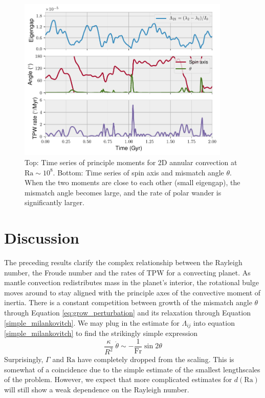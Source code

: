 \documentclass[extra,mreferee]{gji}
\begin{document}
\begin{figure}
\centering
\label{misfit}
\includegraphics[width=0.9\textwidth]{figures/misfit.pdf}
\caption{Top: Time series of principle moments for 2D annular convection at $\mathrm{Ra}\sim10^8$.  Bottom: Time series of spin axis and mismatch angle $\theta$.  When the two moments are close to each other (small eigengap), the mismatch angle becomes large, and the rate of polar wander is significantly larger.}
\end{figure}



\section{Discussion}

The preceding results clarify the complex relationship between the Rayleigh number, the Froude number and the rates of TPW for a convecting planet.
As mantle convection redistributes mass in the planet's interior, the rotational bulge moves around to stay aligned with the principle axes of the convective moment of inertia. 
There is a constant competition between growth of the mismatch angle $\theta$ through Equation \ref{eq:grow_perturbation} and its relaxation through Equation \ref{simple_milankovitch}.
We may plug in the estimate for $\Lambda_{ij}$ into equation \ref{simple_milankovitch} to find the strikingly simple expression
\begin{equation}
\frac{\kappa}{R^2} \; \dot{\theta} \sim -\frac{1}{\mathrm{Fr}} \sin{2 \theta}
\label{eq:simplest_milankovitch}
\end{equation}
Surprisingly, $\Gamma$ and $\mathrm{Ra}$ have completely dropped from the scaling. 
This is somewhat of a coincidence due to the simple estimate of the smallest lengthscales of the problem.
However, we expect that more complicated estimates for $d(\mathrm{Ra})$ will still show a weak dependence on the Rayleigh number.
\end{document}
